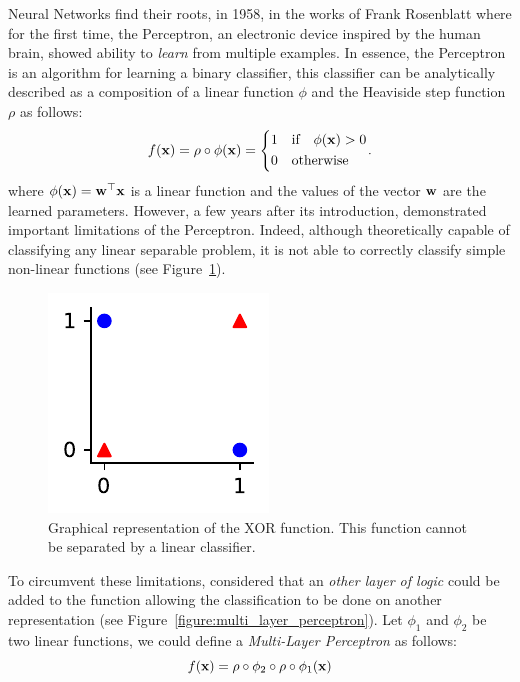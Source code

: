 Neural Networks find their roots, in 1958, in the works of Frank Rosenblatt \cite{rosenblatt1958perceptron} where for the first time, the Perceptron, an electronic device inspired by the human brain, showed ability to \emph{learn} from multiple examples.
In essence, the Perceptron is an algorithm for learning a binary classifier, this classifier can be analytically described as a composition of a linear function $\phi$ and the Heaviside step function $\rho$ as follows:
\begin{equation}
  f(\xvec) = \rho \circ \phi(\xvec) = \left\{ 
    \begin{aligned}
      &1 \quad \text{if} \quad \phi(\xvec) > 0  \\
      &0 \quad \text{otherwise}
    \end{aligned}
    \right. .
\end{equation}
where $\phi(\mathbf{x}) = \mathbf{w}^\top \mathbf{x}$ is a linear function and the values of the vector $\mathbf{w}$ are the learned parameters. 
However, a few years after its introduction, \citet{minsky1969perceptrons} demonstrated important limitations of the Perceptron.
Indeed, although theoretically capable of classifying any linear separable problem, it is not able to correctly classify simple non-linear functions (see Figure~\ref{figure:xor_function}).
\begin{figure}[htb]
  \centering
  \includegraphics{figures/chapter1/xor_function.pdf}
  \caption{Graphical representation of the XOR function. This function cannot be separated by a linear classifier.}
  \label{figure:xor_function}
\end{figure}
To circumvent these limitations, \citet{minsky1969perceptrons} considered that an \emph{other layer of logic} could be added to the function allowing the classification to be done on another representation (see Figure~\ref{figure:multi_layer_perceptron}).
Let $\phi_1$ and $\phi_2$ be two linear functions, we could define a \emph{Multi-Layer Perceptron} as follows:
\begin{equation}
  f(\mathbf{x}) = \rho \circ \phi_2 \circ \rho \circ \phi_1( \mathbf{x} )
\end{equation}

